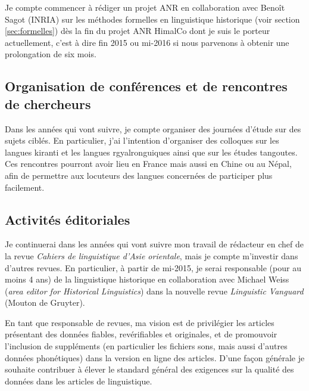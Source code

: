 \documentclass[oldfontcommands,oneside,a4paper,11pt]{article}
\begin{document}
Je compte commencer à rédiger un projet ANR en collaboration avec Benoît Sagot (INRIA) sur les méthodes formelles en linguistique historique (voir section \ref{sec:formelles}) dès la fin du projet ANR HimalCo dont je suis le porteur actuellement, c'est à dire fin 2015 ou mi-2016 si nous parvenons à obtenir une prolongation de six mois.

\subsection{Organisation de conférences et de rencontres de chercheurs}

Dans les années qui vont suivre, je compte organiser des journées d'étude sur des sujets ciblés. En particulier, j'ai l'intention d'organiser des colloques sur les langues kiranti et les langues rgyalronguiques ainsi que sur les études tangoutes. Ces rencontres pourront avoir lieu en France mais aussi en Chine ou au Népal, afin de permettre aux locuteurs des langues concernées de participer plus facilement. 




\subsection{Activités éditoriales}
Je continuerai dans les années qui vont suivre mon travail de rédacteur en chef de la revue \textit{Cahiers de linguistique d'Asie orientale}, mais je compte m'investir dans d'autres revues. En particulier, à partir de mi-2015, je serai responsable (pour au moins 4 ans) de la linguistique historique en collaboration avec Michael Weiss (\textit{area editor for Historical Linguistics}) dans la nouvelle revue \textit{Linguistic Vanguard} (Mouton de Gruyter). 

En tant que responsable de revues, ma vision est de privilégier les articles présentant des données fiables,  revérifiables et originales, et de promouvoir l'inclusion de suppléments (en particulier les fichiers sons, mais aussi d'autres données phonétiques) dans la version en ligne des articles. D'une façon générale je souhaite contribuer à élever le standard général des exigences sur la qualité des données dans les articles de linguistique. %
\end{document}
